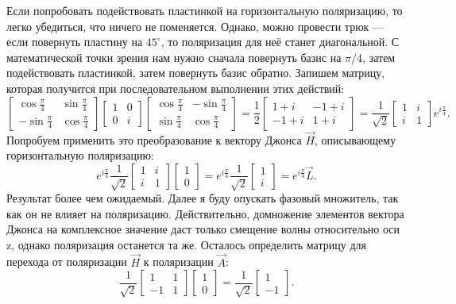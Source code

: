 Если попробовать подействовать пластинкой на горизонтальную поляризацию, то
легко убедиться, что ничего не поменяется. Однако, можно провести трюк --- если
повернуть пластину на $45^{\circ}$, то поляризация для неё станет диагональной.
С математической точки зрения нам нужно сначала повернуть базис на $\pi/4$,
затем подействовать пластинкой, затем повернуть базис обратно. Запишем матрицу,
которая получится при последовательном выполнении этих действий:
\[
  \begin{bmatrix} \cos \frac{\pi}{4} & \sin \frac{\pi}{4} \\ -\sin \frac{\pi}{4} & \cos \frac{\pi}{4} \end{bmatrix} \begin{bmatrix} 1 & 0 \\ 0 & i \end{bmatrix} \begin{bmatrix} \cos \frac{\pi}{4} & -\sin \frac{\pi}{4} \\ \sin \frac{\pi}{4} & \cos \frac{\pi}{4} \end{bmatrix} = \frac{1}{2} \begin{bmatrix} 1 + i& -1 + i \\ -1 + i & 1 + i \end{bmatrix} = \frac{1}{\sqrt{2}}\begin{bmatrix} 1 & i \\ i & 1 \end{bmatrix}e^{i\frac{\pi}{4}}.
\]
Попробуем применить это преобразование к вектору Джонса $\Vec{H}$, описывающему
горизонтальную поляризацию:
\[
  e^{i\frac{\pi}{4}}\frac{1}{\sqrt{2}}\begin{bmatrix} 1 & i \\ i & 1 \end{bmatrix}\begin{bmatrix} 1  \\ 0 \end{bmatrix} = e^{i\frac{\pi}{4}}\frac{1}{\sqrt{2}}\begin{bmatrix} 1  \\ i \end{bmatrix} = e^{i\frac{\pi}{4}}\Vec{L}.
\]
Результат более чем ожидаемый. Далее я буду опускать фазовый множитель, так как
он не влияет на поляризацию. Действительно, домножение элементов вектора Джонса
на комплексное значение даст только смещение волны относительно оси z, однако
поляризация останется та же. Осталось определить матрицу для перехода от
поляризации $\Vec{H}$ к поляризации $\Vec{A}$:
\[
  \frac{1}{\sqrt{2}}\begin{bmatrix} 1 & 1 \\ -1 & 1 \end{bmatrix}\begin{bmatrix} 1  \\ 0 \end{bmatrix} = \frac{1}{\sqrt{2}}\begin{bmatrix} 1  \\ -1 \end{bmatrix}.
\]
